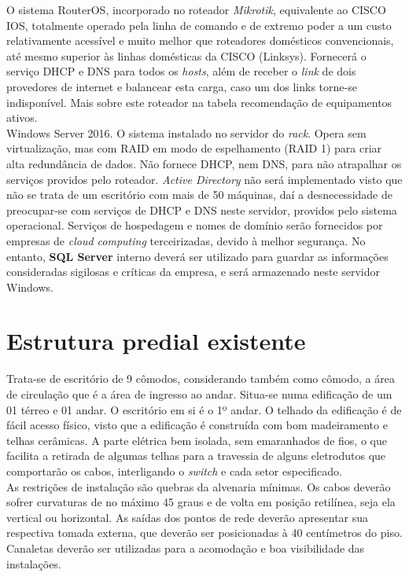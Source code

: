\documentclass[	DIV=calc,%
							paper=a4,%
							fontsize=12pt,%
							onecolumn]{scrartcl}	 					%
\begin{document}
O sistema RouterOS, incorporado no roteador \textit{Mikrotik}, equivalente ao CISCO IOS, totalmente operado pela linha de comando e de extremo poder a um custo relativamente acessível e muito melhor que roteadores domésticos convencionais, até mesmo superior às linhas domésticas da CISCO (Linksys). Fornecerá o serviço DHCP e DNS para todos os \textit{hosts}, além de receber o \textit{link} de dois provedores de internet e balancear esta carga, caso um dos links torne-se indisponível. Mais sobre este roteador na tabela recomendação de equipamentos ativos.
\\

Windows Server 2016. O sistema instalado no servidor do \textit{rack}. Opera sem virtualização, mas com RAID em modo de espelhamento (RAID 1) para criar alta redundância de dados. Não fornece DHCP, nem DNS, para não atrapalhar os serviços providos pelo roteador. \textit{Active Directory }não será implementado visto que não se trata de um escritório com mais de 50 máquinas, daí a desnecessidade de preocupar-se com serviços de DHCP e DNS neste servidor, providos pelo sistema operacional. Serviços de hospedagem e nomes de domínio serão fornecidos por empresas de \textit{cloud computing} terceirizadas, devido à melhor segurança. No entanto, \textbf{SQL Server} interno deverá ser utilizado para guardar as informações consideradas sigilosas e críticas da empresa, e será armazenado neste servidor Windows.


\section{Estrutura predial existente}

Trata-se de escritório de 9 cômodos, considerando também como cômodo, a área de circulação que é a área de ingresso ao andar. Situa-se numa edificação de um 01 térreo e 01 andar. O escritório em si é o 1º andar. O telhado da edificação é de fácil acesso físico, visto que a edificação é construída com bom madeiramento e telhas cerâmicas. A parte elétrica bem isolada, sem emaranhados de fios, o que facilita a retirada de algumas telhas para a travessia de alguns eletrodutos que comportarão os cabos, interligando o \textit{switch} e cada setor especificado. \\

As restrições de instalação são quebras da alvenaria mínimas. Os cabos deverão sofrer curvaturas de no máximo 45 graus e de volta em posição retilínea, seja ela vertical ou horizontal. As saídas dos pontos de rede deverão apresentar sua respectiva tomada externa, que deverão ser posicionadas à 40 centímetros do piso. Canaletas deverão ser utilizadas para a acomodação e boa visibilidade das instalações.
\\
\end{document}
